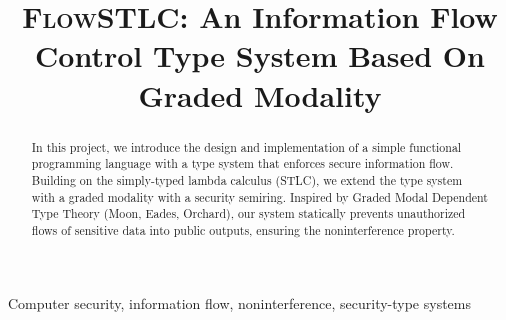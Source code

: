 \documentclass[conference]{IEEEtran}
\begin{document}
\title{\textsc{FlowSTLC}: An Information Flow Control Type System Based On Graded Modality
}

\author{
\and
{}
\and
{}
}

\maketitle

\begin{abstract}
In this project, we introduce the design and implementation of a simple functional programming language with a type system that enforces secure information flow. Building on the simply-typed lambda calculus (STLC), we extend the type system with a graded modality with a security semiring. Inspired by Graded Modal Dependent Type Theory (Moon, Eades, Orchard), our system statically prevents unauthorized flows of sensitive data into public outputs, ensuring the noninterference property.
\end{abstract}

\begin{IEEEkeywords}
Computer security, information flow, noninterference, security-type systems
\end{IEEEkeywords}
\end{document}
